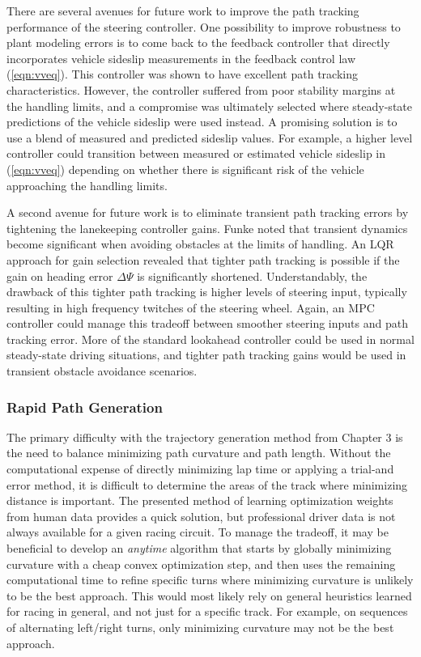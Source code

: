 There are several avenues for future work to improve the path tracking performance of the steering controller. One possibility to improve robustness
to plant modeling errors is to come back to the feedback controller that directly incorporates vehicle sideslip measurements in the feedback
control law (\ref{eqn:vveq}). This controller was shown to have excellent path tracking characteristics. However, the controller suffered from
poor stability margins at the handling limits, and a compromise was ultimately selected where steady-state predictions of the vehicle
sideslip were used instead. A promising solution is to use a blend of measured and predicted sideslip values. For example, a higher level controller could transition between measured or estimated vehicle sideslip in (\ref{eqn:vveq}) depending
on whether there is significant risk of the vehicle approaching the handling limits. 

A second avenue for future work is to eliminate transient path tracking errors by tightening the lanekeeping controller gains. Funke \cite{joethesis}
noted that transient dynamics become significant when avoiding obstacles at the limits of handling. An LQR approach for gain selection revealed that
tighter path tracking is possible if the gain on heading error $\Delta\Psi$ is significantly shortened. Understandably, the drawback of this tighter path tracking is higher
levels of steering input, typically resulting in high frequency twitches of the steering wheel. Again, an MPC controller could manage this
tradeoff between smoother steering inputs and path tracking error. More of the standard lookahead controller could be used in normal steady-state driving situations, and tighter
path tracking gains would be used in transient obstacle avoidance scenarios. 

\subsubsection{Rapid Path Generation}

The primary difficulty with the trajectory generation method from Chapter 3 is the need to balance minimizing path curvature and path length. 
Without the computational expense of directly minimizing lap time or applying a trial-and error method, it is difficult to determine
the areas of the track where minimizing distance is important. The presented method of learning optimization weights from human data provides a 
quick solution, but professional driver data is not
always available for a given racing circuit. To manage the tradeoff, it may be beneficial to develop an \textit{anytime} algorithm that
 starts by globally minimizing curvature with a cheap
convex optimization step, and then uses the remaining computational time to refine specific turns where minimizing curvature is unlikely to be the best approach. This would most likely rely
on general heuristics learned for racing in general, and not just for a specific track. For example, on sequences of alternating left/right turns, only minimizing curvature may not be the best approach. 

